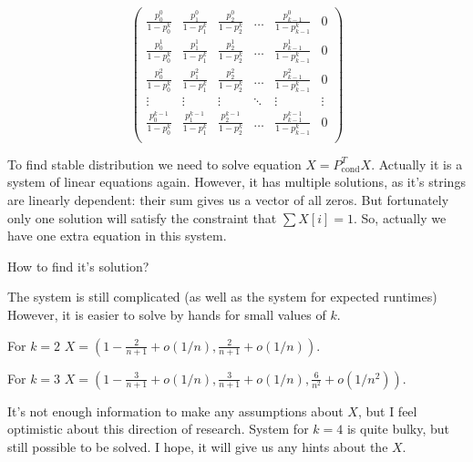 \documentclass{article}
\begin{document}
$$
 \left(
  \begin{array}{ccccc|c}
   \frac{p_0^0}{1 - p_0^{k}} & \frac{p_1^0}{1 - p_1^{k}} & \frac{p_2^0}{1 - p_2^{k}} & \dots & \frac{p_{k - 1}^0}{1 - p_{k - 1}^{k}} & 0 \\
   \frac{p_0^1}{1 - p_0^{k}} & \frac{p_1^1}{1 - p_1^{k}} & \frac{p_2^1}{1 - p_2^{k}} & \dots & \frac{p_{k - 1}^1}{1 - p_{k - 1}^{k}} & 0 \\
   \frac{p_0^2}{1 - p_0^{k}} & \frac{p_1^2}{1 - p_1^{k}} & \frac{p_2^2}{1 - p_2^{k}} & \dots & \frac{p_{k - 1}^2}{1 - p_{k - 1}^{k}} & 0 \\
   \vdots & \vdots & \vdots & \ddots & \vdots & \vdots \\
   \frac{p_0^{k - 1}}{1 - p_0^{k}} & \frac{p_1^{k - 1}}{1 - p_1^{k}} & \frac{p_2^{k - 1}}{1 - p_2^{k}} & \dots & \frac{p_{k - 1}^{k - 1}}{1 - p_{k - 1}^{k}} & 0 \\
  \end{array}
 \right)
$$

To find stable distribution we need to solve equation $X = P_\text{cond}^T X$. Actually it is a system of linear equations again. However, it has multiple solutions, as it's strings are linearly dependent: their sum gives us a vector of all zeros. But fortunately only one solution will satisfy the constraint that $\sum X[i] = 1$. So, actually we have one extra equation in this system.

How to find it's solution?

The system is still complicated (as well as the system for expected runtimes)
However, it is easier to solve by hands for small values of $k$.

For $k = 2$ $X = (1 - \frac{2}{n + 1} + o(1/n), \frac{2}{n + 1} + o(1/n)).$

For $k = 3$ $X = (1 - \frac{3}{n + 1} + o(1/n), \frac{3}{n + 1} + o(1/n), \frac{6}{n^2} + o(1/n^2)).$

It's not enough information to make any assumptions about $X$, but I feel optimistic about this direction of research. System for $k = 4$ is quite bulky, but still possible to be solved. I hope, it will give us any hints about the $X$.
\end{document}
